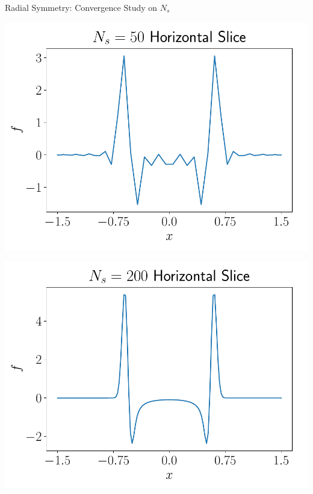 \documentclass{beamer}
\begin{document}
\begin{frame}{Radial Symmetry: Convergence Study on $N_s$}
{\begin{minipage}{0.38\linewidth}
		\includegraphics[width=\linewidth]{figures/Physical_Solution_Symmetric_50_slice.pdf} 
	\end{minipage}
	\hspace{-0.25cm}
	\begin{minipage}{0.38\linewidth}
		\includegraphics[width=\linewidth]{figures/Physical_Solution_Symmetric_200_slice.pdf} 
	\end{minipage}
	}
\end{frame}
\end{document}
